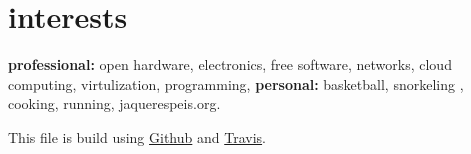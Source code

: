 \documentclass[]{friggeri-cv}
\begin{document}
\section{interests}

\textbf{professional:} open hardware, electronics, free software, networks, cloud computing, virtulization, programming, \textbf{personal:} basketball, snorkeling , cooking, running, jaquerespeis.org.

This file is build using \href{https://github.com}{Github} and \href{https://travis-ci.org/}{Travis}.

%

% 
\end{document}
